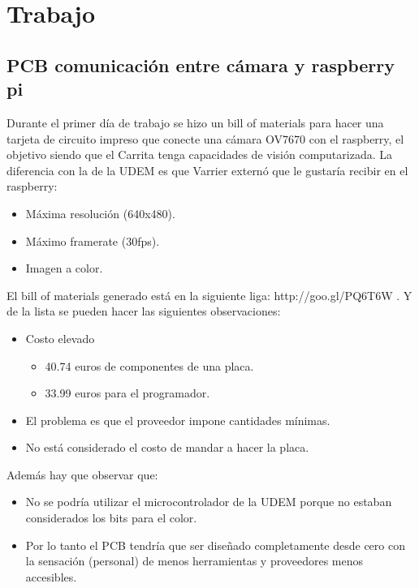 \documentclass[paper=a4, fontsize=11pt]{scrartcl} %
\numberwithin{equation}{section}
\numberwithin{figure}{section}
\numberwithin{table}{section}
\begin{document}
\section{Trabajo}
\subsection{PCB comunicaci\'{o}n entre c\'{a}mara y raspberry pi}
Durante el primer d\'{i}a de trabajo se hizo un bill of materials para hacer una tarjeta de circuito impreso que conecte una c\'{a}mara OV7670 con el raspberry, el objetivo siendo que el Carrita tenga capacidades de visi\'{o}n computarizada. La diferencia con la de la UDEM es que Varrier extern\'{o} que le gustar\'{i}a recibir en el raspberry:
\begin{itemize}
	\item M\'{a}xima resoluci\'{o}n (640x480).
	\item M\'{a}ximo framerate (30fps).
	\item Imagen a color.
\end{itemize}
El bill of materials generado est\'{a} en la siguiente liga: http://goo.gl/PQ6T6W . Y de la lista se pueden hacer las siguientes observaciones:
\begin{itemize}
	\item Costo elevado
	\begin{itemize}
		\item 40.74 euros de componentes de una placa.
		\item 33.99 euros para el programador.
	\end{itemize}
	\item El problema es que el proveedor impone cantidades m\'{i}nimas.
	\item No est\'{a} considerado el costo de mandar a hacer la placa.
\end{itemize}
Adem\'{a}s hay que observar que:
\begin{itemize}
	\item No se podr\'{i}a utilizar el microcontrolador de la UDEM porque no estaban considerados los bits para el color.
	\item Por lo tanto el PCB tendr\'{i}a que ser diseñado completamente desde cero con la sensaci\'{o}n (personal) de menos herramientas y proveedores menos accesibles.
\end{itemize}
\end{document}
